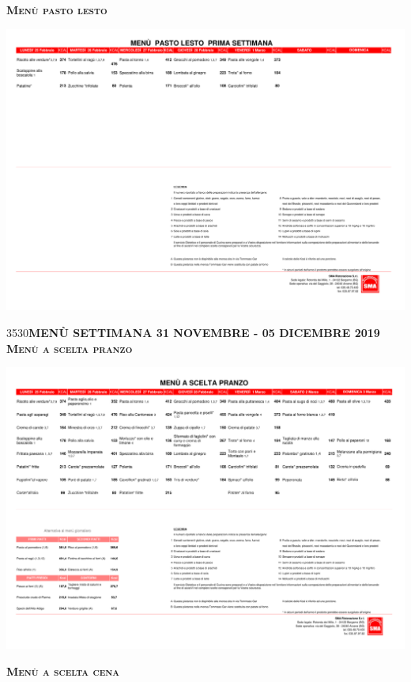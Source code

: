 \documentclass{article}
\makeatletter
\newcommand\HUGE{\@setfontsize\Huge{35}{30}}
\newcommand{\frasedue}{MENÙ SETTIMANA 31 NOVEMBRE - 05 DICEMBRE 2019}
\makeatother
\begin{document}
\vspace{0.3cm}
\begin{center}
{\Huge \textbf{\textsc{Menù pasto lesto}}}\\
\end{center}
\includegraphics[trim=0cm 23cm 0cm 2cm,clip,page=1,width=\textwidth,]{lesto.pdf}
\newpage
\begin{center}
{\HUGE \color{red}\textbf{\frasedue}}\\
\vspace{0.7cm}
{\Huge \textbf{\textsc{Menù a scelta pranzo}}}\\
\end{center}
\includegraphics[trim=0cm 16cm 0cm 2cm,clip,page=3,width=\textwidth,]{scelta.pdf}
\vspace{0.3cm}
\begin{center}
{\Huge \textbf{\textsc{Menù a scelta cena}}}\\
\end{center}
\end{document}
